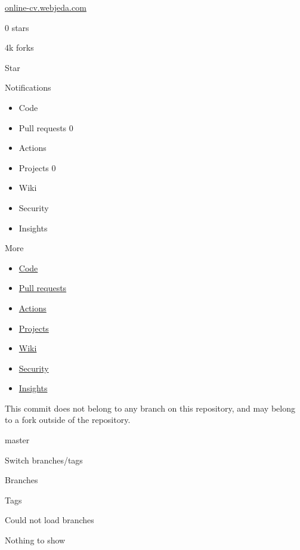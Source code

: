 \documentclass[]{article}
\providecommand{\tightlist}{%
  \setlength{\itemsep}{0pt}\setlength{\parskip}{0pt}}
\begin{document}
{ \href{https://online-cv.webjeda.com}{online-cv.webjeda.com} }

{0} stars

{4k} forks

{ Star }

Notifications

\begin{itemize}
\tightlist
\item
  {Code} \protect\hypertarget{code-repo-tab-count}{}{}
\item
  {Pull requests}
  \protect\hypertarget{pull-requests-repo-tab-count}{}{0}
\item
  {Actions} \protect\hypertarget{actions-repo-tab-count}{}{}
\item
  {Projects} \protect\hypertarget{projects-repo-tab-count}{}{0}
\item
  {Wiki} \protect\hypertarget{wiki-repo-tab-count}{}{}
\item
  {Security}
\item
  {Insights} \protect\hypertarget{insights-repo-tab-count}{}{}
\end{itemize}

{More}

\begin{itemize}
\tightlist
\item
  \href{/CptMike/online-cv}{Code}
\item
  \href{/CptMike/online-cv/pulls}{Pull requests}
\item
  \href{/CptMike/online-cv/actions}{Actions}
\item
  \href{/CptMike/online-cv/projects?type=beta}{Projects}
\item
  \href{/CptMike/online-cv/wiki}{Wiki}
\item
  \href{/CptMike/online-cv/security}{Security}
\item
  \href{/CptMike/online-cv/pulse}{Insights}
\end{itemize}

\hypertarget{repo-content-pjax-container}{}
\hypertarget{spoof-warning}{}
This commit does not belong to any branch on this repository, and may
belong to a fork outside of the repository.

{master} {}

{Switch branches/tags}

Branches

Tags

\hypertarget{ref-list-branches}{}
Could not load branches

Nothing to show
\end{document}
